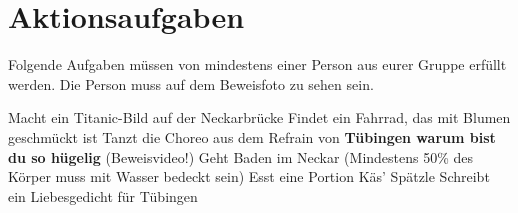 \documentclass[11pt,paper=a4,answers]{exam}
\renewenvironment{questions}{
	\begin{q}
		\pointsinrightmargin
		\marginpointname{Pkt}
		\pointpoints{Pkt}{Pkt}
		\bracketedpoints }{
	\end{q}}
\begin{document}
\section*{Aktionsaufgaben}
	Folgende Aufgaben müssen von mindestens einer Person aus eurer Gruppe erfüllt werden. Die Person muss auf dem Beweisfoto zu sehen sein.
	\begin{questions}
		\question[2] Macht ein Titanic-Bild auf der Neckarbrücke
		\question[4] Findet ein Fahrrad, das mit Blumen geschmückt ist
		\question[20] Tanzt die Choreo aus dem Refrain von \textbf{Tübingen warum bist du so hügelig} (Beweisvideo!)
		\question[20] Geht Baden im Neckar (Mindestens 50\% des Körper muss mit Wasser bedeckt sein)
		\question[5] Esst eine Portion Käs' Spätzle
		\question[10] Schreibt ein Liebesgedicht für Tübingen
		
	\end{questions}
\end{document}
